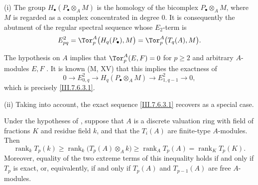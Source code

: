 \begin{remarks}[7.6.4]
\label{III.7.6.4}
\textnormal{(i)}
The group $H_\bullet(P_\bullet\otimes_A M)$ is the homology of
the bicomplex $P_\bullet\otimes_A M$, where $M$ is regarded as
a complex concentrated in degree $0$.  It is consequently
 the abutment of the regular
spectral sequence whose $E_2$-term is
\[
  E^2_{pq}
  =
  \Tor_p^A\bigl(H_q(P_\bullet),M\bigr)
  =
  \Tor_p^A\bigl(T_q(A),M\bigr).
\]

The hypothesis on $A$ implies that
$\Tor_p^A(E,F)=0$ for $p\geq 2$ and arbitrary $A$-modules
$E,F$ .  It is known (M, XV) that this
implies the exactness of
\[
  0\longrightarrow E^2_{0,q}
  \longrightarrow H_q(P_\bullet\otimes_A M)
  \longrightarrow E^2_{1,q-1}
  \longrightarrow 0,
\]
which is precisely \eqref{III.7.6.3.1}.

\medskip
\textnormal{(ii)}
Taking  into account, the exact sequence
\eqref{III.7.6.3.1} recovers  as a special
case.
\end{remarks}

\begin{corollary}[7.6.5]
\label{III.7.6.5}
Under the hypotheses of , suppose that $A$ is
a discrete valuation ring with field of fractions $K$ and
residue field $k$, and that the $T_i(A)$ are finite-type
$A$-modules.  Then
\[
  \operatorname{rank}_k T_p(k)
  \geq
  \operatorname{rank}_k\bigl(T_p(A)\otimes_A k\bigr)
  \geq
  \operatorname{rank}_A T_p(A)
  =
  \operatorname{rank}_K T_p(K).
  \tag{7.6.5.1}\label{III.7.6.5.1}
\]
Moreover, equality of the two extreme terms of this
inequality holds if and only if $T_p$ is exact, or,
equivalently, if and only if $T_p(A)$ and $T_{p-1}(A)$ are
free $A$-modules.
\end{corollary}

